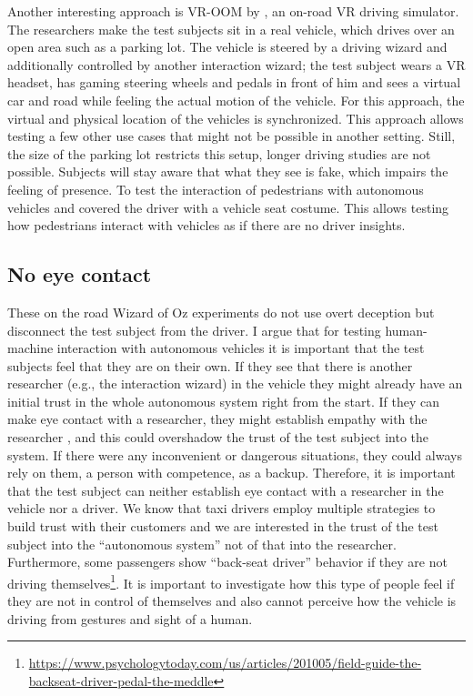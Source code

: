 Another interesting approach is VR-OOM by \citet{Goedicke2018}, an on-road VR driving simulator. The researchers make the test subjects sit in a real vehicle, which drives over an open area such as a parking lot. The vehicle is steered by a driving wizard and additionally controlled by another interaction wizard; the test subject wears a VR headset, has gaming steering wheels and pedals in front of him and sees a virtual car and road while feeling the actual motion of the vehicle. For this approach, the virtual and physical location of the vehicles is synchronized. This approach allows testing a few other use cases that might not be possible in another setting. Still, the size of the parking lot restricts this setup, longer driving studies are not possible. Subjects will stay aware that what they see is fake, which impairs the feeling of presence. 
To test the interaction of pedestrians with autonomous vehicles \citet{FordMotorCompany2017FordPeople} and \citet{Rothenbucher2016} covered the driver with a vehicle seat costume. This allows testing how pedestrians interact with vehicles as if there are no driver insights. 

\subsection{No eye contact}
These on the road Wizard of Oz experiments do not use overt deception but disconnect the test subject from the driver. I argue that for testing human-machine interaction with autonomous vehicles it is important that the test subjects feel that they are on their own. If they see that there is another researcher (e.g., the interaction wizard) in the vehicle they might already have an initial trust in the whole autonomous system right from the start. If they can make eye contact with a researcher, they might establish empathy with the researcher \citep[see][]{Haase1972NonverbalCommunication}, and this could overshadow the trust of the test subject into the system. If there were any inconvenient or dangerous situations, they could always rely on them, a person with competence, as a backup. Therefore, it is important that the test subject can neither establish eye contact with a researcher in the vehicle nor a driver. We know that taxi drivers employ multiple strategies to build trust with their customers \citep[see][]{Gambetta2005Streetwise} and we are interested in the trust of the test subject into the “autonomous system” not of that into the researcher. Furthermore, some passengers show “back-seat driver” behavior if they are not driving themselves\footnote{\url{https://www.psychologytoday.com/us/articles/201005/field-guide-the-backseat-driver-pedal-the-meddle}}. It is important to investigate how this type of people feel if they are not in control of themselves and also cannot perceive how the vehicle is driving from gestures and sight of a human. 

